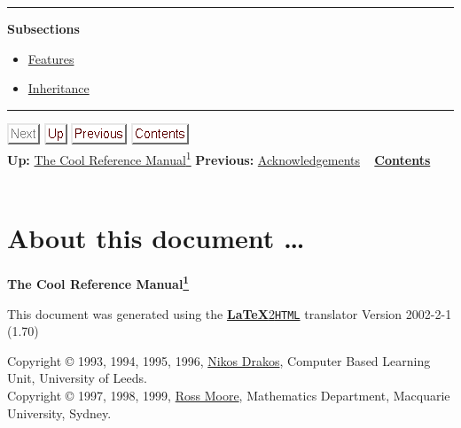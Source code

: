 \documentclass[]{article}
\begin{document}
\begin{center}\rule{3in}{0.4pt}\end{center}

\textbf{Subsections}

\begin{itemize}
\itemsep1pt\parskip0pt
\item
  \href{node5.html}{Features}
\item
  \href{node6.html}{Inheritance}
\end{itemize}

\begin{center}\rule{3in}{0.4pt}\end{center}

\includegraphics{next_g.png}
\href{cool-manual.html}{\includegraphics{up.png}}
\href{node49.html}{\includegraphics{prev.png}}
\href{node1.html}{\includegraphics{contents.png}} \\ \textbf{Up:}
\href{cool-manual.html}{The Cool Reference Manual\textsuperscript{1}}
\textbf{Previous:} \href{node49.html}{Acknowledgements} ~
\textbf{\href{node1.html}{Contents}} \\ \\

\section{About this document \ldots{}}

\textbf{The Cool Reference
Manual\href{footnode.html\#foot266}{\textsuperscript{1}}}

This document was generated using the
\href{http://www.latex2html.org/}{\textbf{LaTeX}2\texttt{HTML}}
translator Version 2002-2-1 (1.70)

Copyright © 1993, 1994, 1995, 1996,
\href{http://cbl.leeds.ac.uk/nikos/personal.html}{Nikos Drakos},
Computer Based Learning Unit, University of Leeds. \\ Copyright © 1997,
1998, 1999, \href{http://www.maths.mq.edu.au/~ross/}{Ross Moore},
Mathematics Department, Macquarie University, Sydney.
\end{document}
